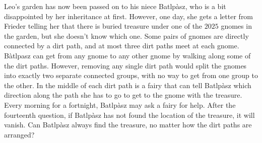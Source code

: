 Leo's garden has now been passed on to his niece Batlpàsz,
who is a bit disappointed by her inheritance at first.
However, one day, she gets a letter from Frieder telling her that there is buried treasure under
one of the $2025$ gnomes in the garden, but she doesn't know which one.
Some pairs of gnomes are directly connected by a dirt path, and at most three dirt paths meet at each gnome.
Bàtlpasz can get from any gnome to any other gnome by walking along some of the dirt paths.
However, removing any single dirt path would split the gnomes into exactly two separate connected groups,
with no way to get from one group to the other.
In the middle of each dirt path is a fairy that can tell Batlpàsz which direction along the path she
has to go to get to the gnome with the treasure.
Every morning for a fortnight, Batlpàsz may ask a fairy for help.
After the fourteenth question, if Batlpàsz has not found the location of the treasure, it will vanish.
Can Batlpàsz always find the treasure, no matter how the dirt paths are arranged?
